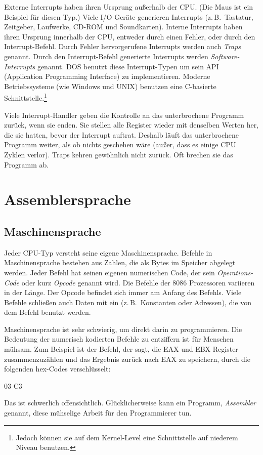 Externe Interrupts haben ihren Ursprung au{\ss}erhalb der CPU\@. (Die
Maus ist ein Beispiel f\"{u}r diesen Typ.) Viele I/O Ger\"{a}te generieren
Interrupts (z.\,B.\ Tastatur, Zeitgeber, Laufwerke, CD-ROM und
Soundkarten). Interne Interrupts haben ihren Ursprung innerhalb der
CPU, entweder durch einen Fehler, oder durch den Interrupt-Befehl.
Durch Fehler hervorgerufene Interrupts werden auch \emph{Traps}
genannt. Durch den Interrupt-Befehl generierte Interrupts werden
\emph{Software-Interrupts} genannt. DOS benutzt diese
Interrupt-Typen um sein API  (Application Programming
Interface) zu implementieren. Moderne Betriebssysteme (wie Windows
und UNIX) benutzen eine C-basierte Schnittstelle.\footnote{Jedoch
k\"{o}nnen sie auf dem Kernel-Level eine Schnittstelle auf niederem
Niveau benutzen.}

Viele Interrupt-Handler geben die Kontrolle an das unterbrochene
Programm zur\"{u}ck, wenn sie enden. Sie stellen alle Register wieder
mit denselben Werten her, die sie hatten, bevor der Interrupt
auftrat. Deshalb l\"{a}uft das unterbrochene Programm weiter, als ob
nichts geschehen w\"{a}re (au{\ss}er, dass es einige CPU Zyklen verlor).
Traps kehren gew\"{o}hnlich nicht zur\"{u}ck. Oft brechen sie das Programm
ab.

\section{Assemblersprache}

\subsection{Maschinensprache}

Jeder CPU-Typ versteht seine eigene Maschinensprache. Befehle in
Maschinensprache bestehen aus Zahlen, die als Bytes im Speicher
abgelegt werden. Jeder Befehl hat seinen eigenen numerischen Code,
der sein \emph{Operations-Code} oder kurz \emph{Opcode}
 genannt wird. Die Befehle der 8086 Prozessoren
variieren in der L\"{a}nge. Der Opcode befindet sich immer am Anfang des
Befehls. Viele Befehle schlie{\ss}en auch Daten mit ein (z.\,B.\
Konstanten oder Adressen), die von dem Befehl benutzt werden.

Maschinensprache ist sehr schwierig, um direkt darin zu
programmieren. Die Bedeutung der numerisch kodierten Befehle zu
entziffern ist f\"{u}r Menschen m\"{u}hsam. Zum Beispiel ist der Befehl, der
sagt, die EAX und EBX Register zusammenzuz\"{a}hlen und das Ergebnis
zur\"{u}ck nach EAX zu speichern, durch die folgenden hex-Codes
verschl\"{u}sselt:
\begin{CodeQuote}
   03 C3
\end{CodeQuote}
Das ist schwerlich offensichtlich. Gl\"{u}cklicherweise kann ein
Programm, \emph{Assembler} \index{Assembler} genannt, diese
m\"{u}hselige Arbeit f\"{u}r den Programmierer tun.


